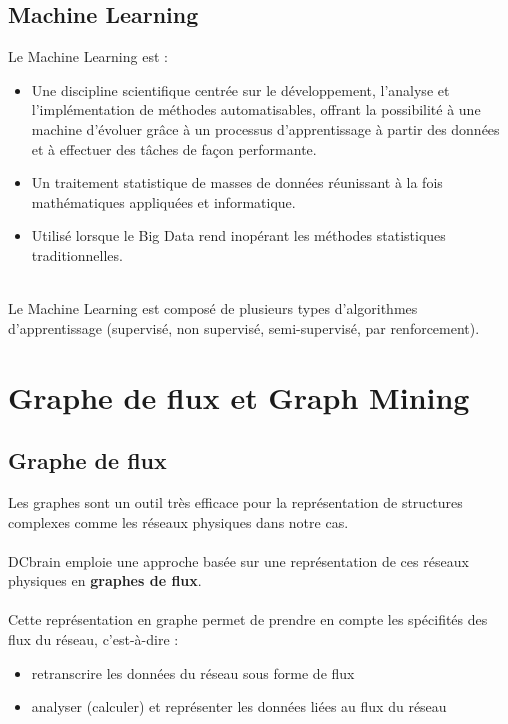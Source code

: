 	\subsection{Machine Learning}
	\begin{frame}
		\begin{block}{Le Machine Learning est :}
			\begin{itemize}	
				\pause \item Une discipline scientifique centrée sur le développement, l’analyse et l’implémentation de méthodes automatisables, offrant la possibilité à une machine d’évoluer grâce à un processus d’apprentissage à partir des données et à effectuer des tâches de façon performante.
				\pause\item Un traitement statistique de masses de données réunissant à la fois mathématiques appliquées et informatique.
				\pause\item Utilisé lorsque le Big Data rend inopérant les méthodes statistiques traditionnelles.
			\end{itemize}
		\end{block}
		~\\
		\pause
		Le Machine Learning est composé de plusieurs types d'algorithmes d’apprentissage (supervisé, non supervisé, semi-supervisé, par renforcement).
	\end{frame}
	
	\section{Graphe de flux et Graph Mining}
	\subsection{Graphe de flux}
	\begin{frame}
		Les graphes sont un outil très efficace pour la représentation de structures complexes comme les réseaux physiques dans notre cas. 
		\\~\\
		\pause
		DCbrain emploie une approche basée sur une représentation de ces réseaux physiques en \textbf{graphes de flux}.\\~\\
		\pause
		Cette représentation en graphe permet de prendre en compte les spécifités des flux du réseau, c'est-à-dire :
		\begin{itemize}
		\pause
		\item retranscrire les données du réseau sous forme de flux
		\pause
		\item analyser (calculer) et représenter les données liées au flux du réseau
		\end{itemize}
	\end{frame}
	
